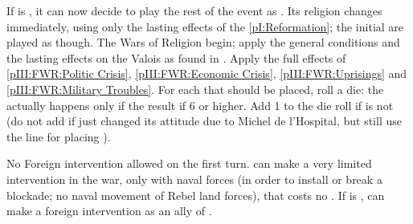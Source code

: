 

\phevnt
{}\label{pIII:FWR:Hospital} If \FRA is \CATHCR, it
can now decide to play the rest of the event as \CATHCO.  Its religion changes
immediately, using only the lasting effects of the \ref{pI:Reformation}; the
initial \REVOLT are played as \CATHCR though.
\aparag The Wars of Religion begin; apply the general conditions and the
lasting effects on the Valois as found in .
\aparag Apply the full effects of \ref{pIII:FWR:Politic Crisis},
\ref{pIII:FWR:Economic Crisis}, \ref{pIII:FWR:Uprisings} and
\ref{pIII:FWR:Military Troubles}.
\bparag For each \REVOLT that should be placed, roll a die: the \REVOLT
actually happens only if the result if 6 or higher. Add 1 to the die roll if
\FRA is not \CATHCO (do not add if \FRA just changed its attitude due to
Michel de l'Hospital, but still use the \CATHCR line for placing \REVOLT ).

\phdipl
\aparag No Foreign intervention allowed on the first turn.
\aparag \REB can make a very limited intervention in the war, only with naval
forces (in order to install or break a blockade; no naval movement of Rebel
land forces), that costs no \STAB.
\aparag If \FRA is \CATHCR, \LIG can make a foreign intervention as an ally of
\FRA.

